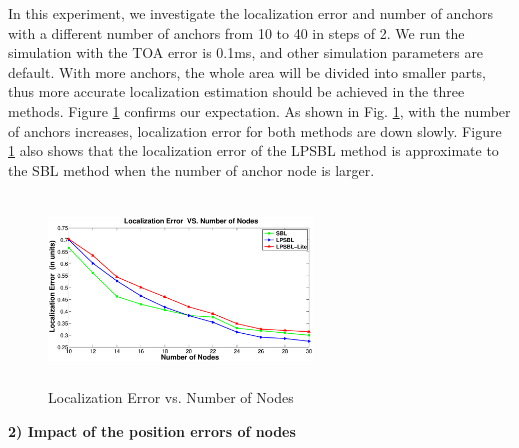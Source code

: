  In this experiment, we investigate the localization error and number of anchors with a different number of anchors from 10 to 40 in steps of 2. 
 We run the simulation with the TOA error is 0.1ms, and other simulation parameters are default. 
 With more anchors, the whole area will be divided into smaller parts, 
 thus more accurate localization estimation should be achieved in the three methods. 
Figure \ref{Nodenumbers} confirms our expectation. As shown in Fig. \ref{Nodenumbers}, with the number of anchors increases, localization error for both  methods are down slowly. 
Figure \ref{Nodenumbers} also shows that the localization error of the LPSBL method is approximate to the SBL method when the number of anchor node is larger.
  \begin{figure}[htb]
            \setlength{\abovecaptionskip}{0pt}
            \centering
			 \vspace{-2mm}
           		 \includegraphics[height=5.0cm,width=7.0cm]{image/Nodenumbers.eps}
            \caption{Localization Error vs. Number of Nodes}
             \vspace{-5mm}
             \label{Nodenumbers}
        \end{figure}	
		
\textbf{2) Impact of the position errors of nodes}

